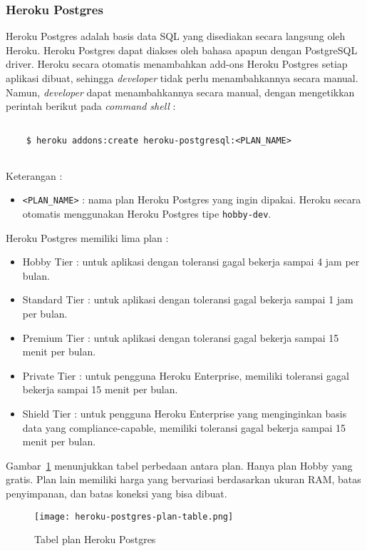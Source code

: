 \subsubsection{Heroku Postgres}
Heroku Postgres adalah basis data SQL yang disediakan secara langsung oleh Heroku. Heroku Postgres dapat diakses oleh bahasa apapun dengan PostgreSQL driver. Heroku secara otomatis menambahkan add-ons Heroku Postgres setiap aplikasi dibuat, sehingga \textit{developer} tidak perlu menambahkannya secara manual. Namun, \textit{developer} dapat menambahkannya secara manual, dengan mengetikkan perintah berikut pada \textit{command shell} :
\begin{lstlisting}
	
	$ heroku addons:create heroku-postgresql:<PLAN_NAME>
	
\end{lstlisting}
Keterangan :
\begin{itemize}
\item \texttt{<PLAN\_NAME>} : nama plan Heroku Postgres yang ingin dipakai. Heroku secara otomatis menggunakan Heroku Postgres tipe \texttt{hobby-dev}.
\end{itemize}

Heroku Postgres memiliki lima plan :
\begin{itemize}
\item Hobby Tier : untuk aplikasi dengan toleransi gagal bekerja sampai 4 jam per bulan.
\item Standard Tier : untuk aplikasi dengan toleransi gagal bekerja sampai 1 jam per bulan.
\item Premium Tier : untuk aplikasi dengan toleransi gagal bekerja sampai 15 menit per bulan.
\item Private Tier : untuk pengguna Heroku Enterprise, memiliki toleransi gagal bekerja sampai 15 menit per bulan.
\item Shield Tier : untuk pengguna Heroku Enterprise yang menginginkan basis data yang compliance-capable, memiliki toleransi gagal bekerja sampai 15 menit per bulan.
\end{itemize}

Gambar~\ref{fig:heroku-postgres-plan-table} menunjukkan tabel perbedaan antara plan. Hanya plan Hobby yang gratis. Plan lain memiliki harga yang bervariasi berdasarkan ukuran RAM, batas penyimpanan, dan batas koneksi yang bisa dibuat.
\begin{figure}[H]
	\centering  
	\texttt{[image: heroku-postgres-plan-table.png]}  
	\caption[Tabel plan Heroku Postgres]{Tabel plan Heroku Postgres} 
	\label{fig:heroku-postgres-plan-table} 
\end{figure}

